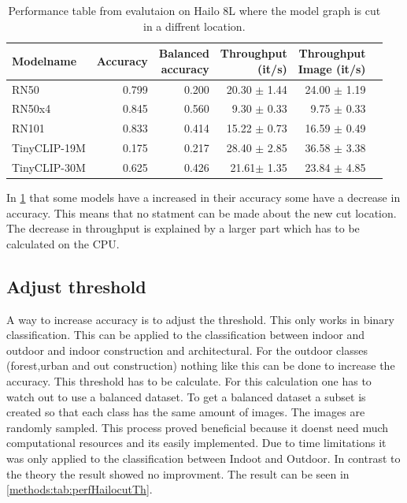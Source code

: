 \begin{table}[]
    \centering
    \begin{tabular}{l|rrrrr}
        \hline
        Modelname & Accuracy &  \makecell{Balanced \\accuracy}&\makecell{Throughput\\(it/s)} & \makecell{Throughput \\ Image (it/s)} & \\ \hline
        RN50 & 0.799 & 0.200 & 20.30 $\pm$ 1.44 & 24.00 $\pm$ 1.19  \\ 
        RN50x4 & 0.845 & 0.560 & 9.30  $\pm$ 0.33 & 9.75  $\pm$ 0.33\\
        RN101 & 0.833& 0.414 & 15.22 $\pm$ 0.73 & 16.59 $\pm$ 0.49\\  
        TinyCLIP-19M & 0.175 & 0.217 & 28.40 $\pm$ 2.85 & 36.58 $\pm$ 3.38 \\ 
        TinyCLIP-30M & 0.625 & 0.426 & 21.61$\pm$ 1.35 & 23.84 $\pm$ 4.85\\ 
    \end{tabular}
    \caption{Performance table from evalutaion on Hailo 8L where the model graph is cut in a diffrent location.}
    \label{methods:tab:perfHailocut}
\end{table}

In \cref{methods:tab:perfHailocut} that some models have a increased  in their accuracy some have a decrease in accuracy.
This means that no statment can be made about the new cut location.
The decrease in throughput is explained by a larger part which has to be calculated on the CPU.

\subsection{Adjust threshold}

A way to increase accuracy is to adjust the threshold.
This only works in binary classification.
This can be applied to the classification between indoor and outdoor and indoor construction and architectural.
For the outdoor classes (forest,urban and out construction) nothing like this can be done to increase the accuracy.
This threshold has to be calculate.
For this calculation one has to watch out to use a balanced dataset.
To get a balanced dataset a subset is created so that each class has the same amount of images.
The images are randomly sampled.
This process proved beneficial because it doenst need much computational resources and its easily implemented.
Due to time limitations it was only applied to the classification between Indoot and Outdoor.
In contrast to the theory the result showed no improvment.
The result can be seen in \cref{methods:tab:perfHailocutTh}.

